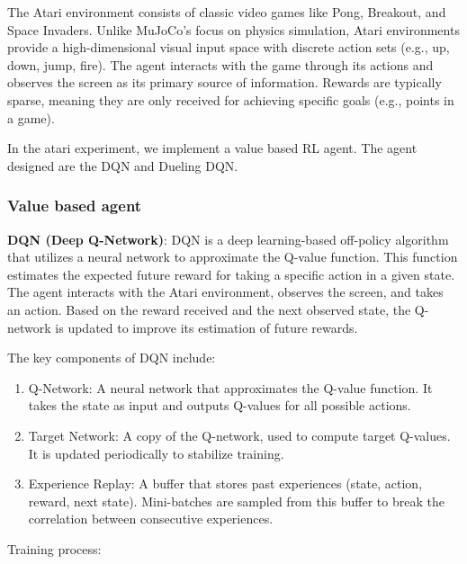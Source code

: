 \documentclass{article}
\begin{document}
The Atari environment consists of classic video games like Pong, Breakout, and
Space Invaders. Unlike MuJoCo's focus on physics simulation, Atari environments
provide a high-dimensional visual input space with discrete action sets (e.g.,
up, down, jump, fire). The agent interacts with the game through its actions
and observes the screen as its primary source of information. Rewards are
typically sparse, meaning they are only received for achieving specific goals
(e.g., points in a game).

In the atari experiment, we implement a value based RL agent. The agent
designed are the DQN and Dueling DQN.

\subsubsection*{Value based agent}

\textbf{DQN (Deep Q-Network)}: DQN is a deep learning-based off-policy algorithm that
utilizes a neural network to approximate the Q-value function. This function
estimates the expected future reward for taking a specific action in a given
state. The agent interacts with the Atari environment, observes the screen, and
takes an action. Based on the reward received and the next observed state, the
Q-network is updated to improve its estimation of future rewards.

The key components of DQN include:

\begin{enumerate}
    \item Q-Network: A neural network that approximates the Q-value function. It takes
          the state as input and outputs Q-values for all possible actions.
    \item Target Network: A copy of the Q-network, used to compute target Q-values. It is
          updated periodically to stabilize training.
    \item Experience Replay: A buffer that stores past experiences (state, action,
          reward, next state). Mini-batches are sampled from this buffer to break the
          correlation between consecutive experiences.
\end{enumerate}

Training process:
\end{document}
